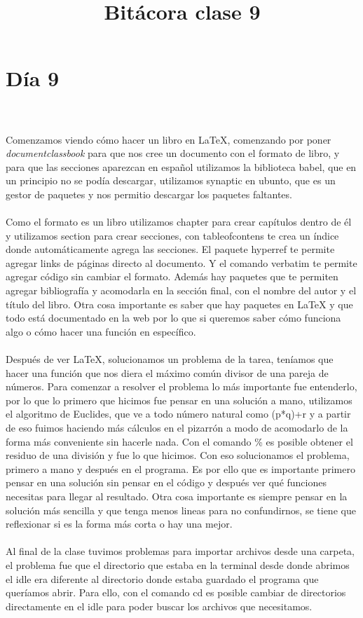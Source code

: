 \documentclass{book}
\begin{document}
	\section{Día 9}
	\title{\Huge Bitácora clase 9} \\
	\\
	Comenzamos viendo cómo hacer un libro en LaTeX, comenzando por poner \textit{documentclass{book}} para que nos cree un documento con el formato de libro, y para que las secciones aparezcan en español utilizamos la biblioteca babel, que en un principio no se podía descargar, utilizamos synaptic en ubunto, que es un gestor de paquetes y nos permitio descargar los paquetes faltantes.\\
	\\
	Como el formato es un libro utilizamos chapter{} para crear capítulos dentro de él y utilizamos section{} para crear secciones, con tableofcontens te crea un índice donde automáticamente agrega las secciones. El paquete hyperref te permite agregar links de páginas directo al documento. Y el comando verbatim te permite agregar código sin cambiar el formato. Además hay paquetes que te permiten agregar bibliografía y acomodarla en la sección final, con el nombre del autor y el título del libro. Otra cosa importante es saber que hay paquetes en LaTeX y que todo está documentado en la web por lo que si queremos saber cómo funciona algo o cómo hacer una función en específico. \\
	\\
	Después de ver LaTeX, solucionamos un problema de la tarea, teníamos que hacer una función que nos diera el máximo común divisor de una pareja de números. Para comenzar a resolver el problema lo más importante fue entenderlo, por lo que lo primero que hicimos fue pensar en una solución a mano, utilizamos el algoritmo de Euclides, que ve a todo número natural como (p*q)+r y a partir de eso fuimos haciendo más cálculos en el pizarrón a modo de acomodarlo de la forma más conveniente sin hacerle nada. Con el comando \% es posible obtener el residuo de una división y fue lo que hicimos. Con eso solucionamos el problema, primero a mano y después en el programa. Es por ello que es importante primero pensar en una solución sin pensar en el código y después ver qué funciones necesitas para llegar al resultado. Otra cosa importante es siempre pensar en la solución más sencilla y que tenga menos lineas para no confundirnos, se  tiene que reflexionar si es la forma más corta o hay una mejor.\\
	\\
	Al final de la clase tuvimos problemas para importar archivos desde una carpeta, el problema fue que el directorio que estaba en la terminal desde donde abrimos el idle era diferente al directorio donde estaba guardado el programa que queríamos abrir. Para ello, con el comando cd es posible cambiar de directorios directamente en el idle para poder buscar los archivos que necesitamos. 
	
\end{document}
